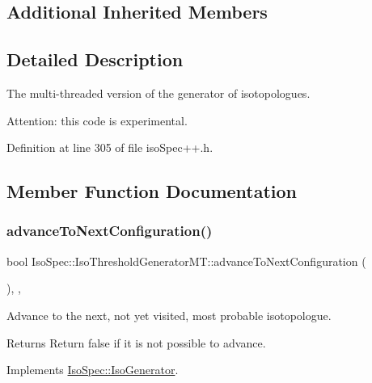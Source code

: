 \subsection*{Additional Inherited Members}


\subsection{Detailed Description}
The multi-\/threaded version of the generator of isotopologues. 

Attention\+: this code is experimental. 

Definition at line 305 of file iso\+Spec++.\+h.



\subsection{Member Function Documentation}
\mbox{\label{class_iso_spec_1_1_iso_threshold_generator_m_t_ab82a60de126aa926b2baf67c49015c22}} 
\subsubsection{\texorpdfstring{advance\+To\+Next\+Configuration()}{advanceToNextConfiguration()}}
{\footnotesize\ttfamily bool Iso\+Spec\+::\+Iso\+Threshold\+Generator\+M\+T\+::advance\+To\+Next\+Configuration (\begin{DoxyParamCaption}{ }\end{DoxyParamCaption})\hspace{0.3cm}{\ttfamily [final]}, {\ttfamily [override]}, {\ttfamily [virtual]}}



Advance to the next, not yet visited, most probable isotopologue. 

\begin{DoxyReturn}{Returns}
Return false if it is not possible to advance. 
\end{DoxyReturn}


Implements \mbox{\hyperlink{class_iso_spec_1_1_iso_generator_a20f48ba18c6aecc57d73b2c3ec3a11dd}{Iso\+Spec\+::\+Iso\+Generator}}.



